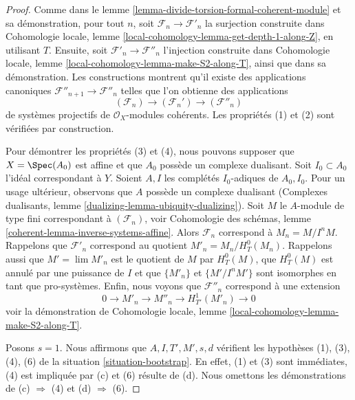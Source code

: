 \begin{proof}
Comme dans le lemme \ref{lemma-divide-torsion-formal-coherent-module} et sa démonstration,
pour tout $n$, soit $\mathcal{F}_n \to \mathcal{F}'_n$ la surjection
construite dans
Cohomologie locale, lemme \ref{local-cohomology-lemma-get-depth-1-along-Z},
en utilisant $T$.
Ensuite, soit $\mathcal{F}'_n \to \mathcal{F}''_n$ l'injection
construite dans
Cohomologie locale, lemme \ref{local-cohomology-lemma-make-S2-along-T},
ainsi que dans sa démonstration. Les constructions montrent qu'il existe des applications canoniques
$\mathcal{F}''_{n + 1} \to \mathcal{F}''_n$ telles que l'on obtienne des
applications
$$
(\mathcal{F}_n) \longrightarrow (\mathcal{F}_n') \longrightarrow
(\mathcal{F}''_n)
$$
de systèmes projectifs de $\mathcal{O}_X$-modules cohérents.
Les propriétés (1) et (2) sont vérifiées par construction.

\medskip\noindent
Pour démontrer les propriétés (3) et (4), nous pouvons supposer que $X = \Spec(A_0)$ est
affine et que $A_0$ possède un complexe dualisant. Soit $I_0 \subset A_0$ l'idéal
correspondant à $Y$. Soient $A, I$ les complétés $I_0$-adiques de
$A_0, I_0$. Pour un usage ultérieur, observons que $A$ possède un complexe dualisant
(Complexes dualisants, lemme \ref{dualizing-lemma-ubiquity-dualizing}).
Soit $M$ le $A$-module de type fini correspondant à $(\mathcal{F}_n)$, voir
Cohomologie des schémas, lemme \ref{coherent-lemma-inverse-systems-affine}.
Alors $\mathcal{F}_n$ correspond à $M_n = M/I^nM$. Rappelons que
$\mathcal{F}'_n$ correspond au quotient $M'_n = M_n / H^0_T(M_n)$.
Rappelons aussi que $M' = \lim M'_n$ est le quotient de $M$ par
$H^0_T(M)$, que $H^0_T(M)$ est annulé par une puissance de $I$ et que
$\{M'_n\}$ et $\{M'/I^nM'\}$ sont isomorphes en tant que pro-systèmes.
Enfin, nous voyons que $\mathcal{F}''_n$ correspond à une extension
$$
0 \to M'_n \to M''_n \to H^1_{T'}(M'_n) \to 0
$$
voir la démonstration de
Cohomologie locale, lemme \ref{local-cohomology-lemma-make-S2-along-T}.

\medskip\noindent
Posons $s = 1$. Nous affirmons que $A, I, T', M', s, d$ vérifient les hypothèses
(1), (3), (4), (6) de la situation \ref{situation-bootstrap}. En effet, (1) et (3)
sont immédiates, (4) est impliquée par (c) et (6) résulte de (d).
Nous omettons les démonstrations de (c) $\Rightarrow$ (4) et (d) $\Rightarrow$ (6).


\end{proof}
